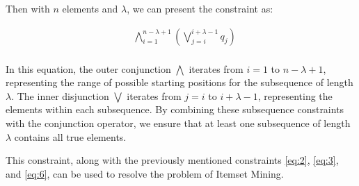 Then with $n$ elements and $\lambda$, we can present the constraint as:

\begin{equation}
    \label{eq:6}
    \begin{aligned}
         & \bigwedge_{i=1}^{n-\lambda+1} \left( \bigvee_{j=i}^{i+\lambda-1} q_j \right) \\
    \end{aligned}
\end{equation}

In this equation, the outer conjunction $\bigwedge$ iterates from $i=1$ to $n-\lambda+1$, representing the range of possible starting positions for the subsequence of length $\lambda$. The inner disjunction $\bigvee$ iterates from $j=i$ to $i+\lambda-1$, representing the elements within each subsequence. By combining these subsequence constraints with the conjunction operator, we ensure that at least one subsequence of length $\lambda$ contains all true elements.

This constraint, along with the previously mentioned constraints \ref{eq:2}, \ref{eq:3}, and \ref{eq:6}, can be used to resolve the problem of Itemset Mining.
